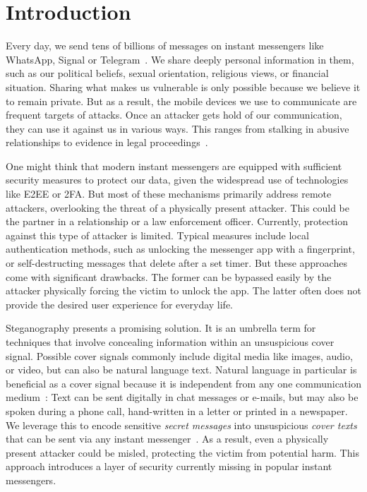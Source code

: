 
\chapter{Introduction}\label{ch:introduction}
\glsresetall %


Every day, we send tens of billions of messages on instant messengers like WhatsApp, Signal or Telegram~\cite{smithMillionWhatsAppMessages2018}. We share deeply personal information in them, such as our political beliefs, sexual orientation, religious views, or financial situation. Sharing what makes us vulnerable is only possible because we believe it to remain private. But as a result, the mobile devices we use to communicate are frequent targets of attacks. Once an attacker gets hold of our communication, they can use it against us in various ways. This ranges from stalking in abusive relationships to evidence in legal proceedings~\cite{obrienNebraskaTeenMother2022,mackeyFrenchScientistDenied2025}.

One might think that modern instant messengers are equipped with sufficient security measures to protect our data, given the widespread use of technologies like \gls{E2EE} or \gls{2FA}. But most of these mechanisms primarily address remote attackers, overlooking the threat of a physically present attacker. This could be the partner in a relationship or a law enforcement officer. Currently, protection against this type of attacker is limited. Typical measures include local authentication methods, such as unlocking the messenger app with a fingerprint, or self-destructing messages that delete after a set timer. But these approaches come with significant drawbacks. The former can be bypassed easily by the attacker physically forcing the victim to unlock the app. The latter often does not provide the desired user experience for everyday life.

Steganography presents a promising solution. It is an umbrella term for techniques that involve concealing information within an unsuspicious cover signal. Possible cover signals commonly include digital media like images, audio, or video, but can also be natural language text. Natural language in particular is beneficial as a cover signal because it is independent from any one communication medium~\cite{zieglerNeuralLinguisticSteganography2019}: Text can be sent digitally in chat messages or e-mails, but may also be spoken during a phone call, hand-written in a letter or printed in a newspaper. We leverage this to encode sensitive \textit{secret messages} into unsuspicious \textit{cover texts} that can be sent via any instant messenger~\cite{zieglerNeuralLinguisticSteganography2019}. As a result, even a physically present attacker could be misled, protecting the victim from potential harm. This approach introduces a layer of security currently missing in popular instant messengers.


